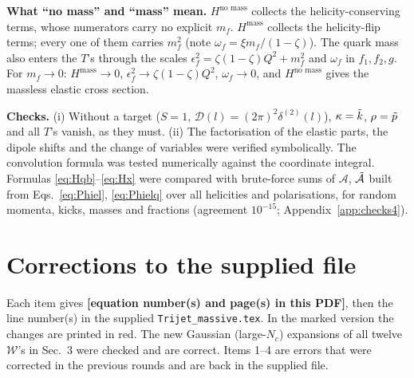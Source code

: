 \documentclass[9pt]{article}
\numberwithin{equation}{section}
\begin{document}
\noindent\textbf{What ``no mass'' and ``mass'' mean.} $H^{\text{no mass}}$ collects the helicity-conserving terms, whose numerators carry no explicit $m_{f}$. $H^{\text{mass}}$ collects the helicity-flip terms; every one of them carries $m^{2}_{f}$ (note $\omega_{f}=\xi m_{f}/(1-\zeta)$). The quark mass also enters the $T$'s through the scales $\epsilon^{2}_{f}=\zeta(1-\zeta)Q^{2}+m^{2}_{f}$ and $\omega_{f}$ in $f_{1},f_{2},g$. For $m_{f}\rightarrow0$: $H^{\text{mass}}\rightarrow0$, $\epsilon^{2}_{f}\rightarrow\zeta(1-\zeta)Q^{2}$, $\omega_{f}\rightarrow0$, and $H^{\text{no mass}}$ gives the massless elastic cross section.

\noindent\textbf{Checks.} (i) Without a target ($S=1$, $\mathcal{D}(l)=(2\pi)^{2}\delta^{(2)}(l)$), $\kappa=\Tilde{k}$, $\rho=\Tilde{p}$ and all $T$'s vanish, as they must. (ii) The factorisation of the elastic parts, the dipole shifts and the change of variables were verified symbolically. The convolution formula was tested numerically against the coordinate integral. Formulas \eqref{eq:Hqb}--\eqref{eq:Hx} were compared with brute-force sums of $\mathcal{A}$, $\Tilde{\mathcal{A}}$ built from Eqs.~\eqref{eq:Phiel}, \eqref{eq:Phielq} over all helicities and polarisations, for random momenta, kicks, masses and fractions (agreement $10^{-15}$; Appendix~\ref{app:checks4}).

\appendix
\section{Corrections to the supplied file}\label{app:corr}
Each item gives \textbf{[equation number(s) and page(s) in this PDF]}, then the line number(s) in the supplied \texttt{Trijet\_massive.tex}. In the marked version the changes are printed in {\color{red}red}. The new Gaussian (large-$N_{c}$) expansions of all twelve $\mathcal{W}$'s in Sec.~3 were checked and are correct. Items 1--4 are errors that were corrected in the previous rounds and are back in the supplied file.
\end{document}
